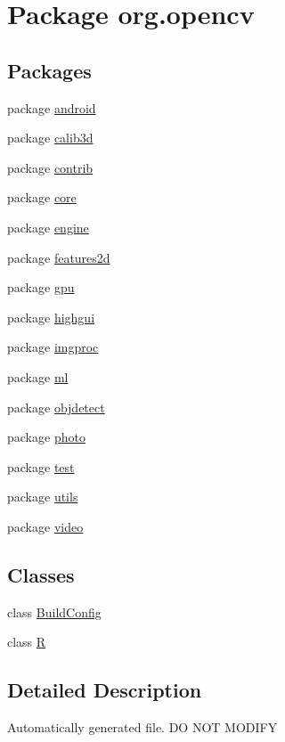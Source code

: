 \hypertarget{namespaceorg_1_1opencv}{}\section{Package org.\+opencv}
\label{namespaceorg_1_1opencv}
\subsection*{Packages}
\begin{DoxyCompactItemize}
\item 
package \mbox{\hyperlink{namespaceorg_1_1opencv_1_1android}{android}}
\item 
package \mbox{\hyperlink{namespaceorg_1_1opencv_1_1calib3d}{calib3d}}
\item 
package \mbox{\hyperlink{namespaceorg_1_1opencv_1_1contrib}{contrib}}
\item 
package \mbox{\hyperlink{namespaceorg_1_1opencv_1_1core}{core}}
\item 
package \mbox{\hyperlink{namespaceorg_1_1opencv_1_1engine}{engine}}
\item 
package \mbox{\hyperlink{namespaceorg_1_1opencv_1_1features2d}{features2d}}
\item 
package \mbox{\hyperlink{namespaceorg_1_1opencv_1_1gpu}{gpu}}
\item 
package \mbox{\hyperlink{namespaceorg_1_1opencv_1_1highgui}{highgui}}
\item 
package \mbox{\hyperlink{namespaceorg_1_1opencv_1_1imgproc}{imgproc}}
\item 
package \mbox{\hyperlink{namespaceorg_1_1opencv_1_1ml}{ml}}
\item 
package \mbox{\hyperlink{namespaceorg_1_1opencv_1_1objdetect}{objdetect}}
\item 
package \mbox{\hyperlink{namespaceorg_1_1opencv_1_1photo}{photo}}
\item 
package \mbox{\hyperlink{namespaceorg_1_1opencv_1_1test}{test}}
\item 
package \mbox{\hyperlink{namespaceorg_1_1opencv_1_1utils}{utils}}
\item 
package \mbox{\hyperlink{namespaceorg_1_1opencv_1_1video}{video}}
\end{DoxyCompactItemize}
\subsection*{Classes}
\begin{DoxyCompactItemize}
\item 
class \mbox{\hyperlink{classorg_1_1opencv_1_1_build_config}{Build\+Config}}
\item 
class \mbox{\hyperlink{classorg_1_1opencv_1_1_r}{R}}
\end{DoxyCompactItemize}


\subsection{Detailed Description}
Automatically generated file. DO N\+OT M\+O\+D\+I\+FY 